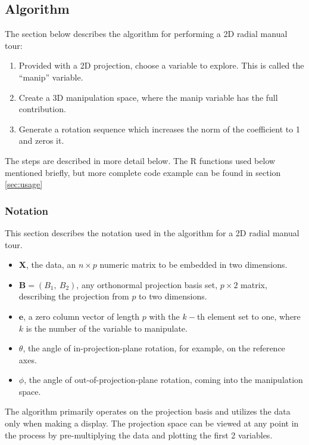 \hypertarget{sec:algorithm}{%
\subsection{Algorithm}\label{sec:algorithm}}

The section below describes the algorithm for performing a 2D radial manual tour:

\begin{enumerate}
\def\labelenumi{\arabic{enumi}.}
\tightlist
\item
  Provided with a 2D projection, choose a variable to explore. This is called the ``manip'' variable.
\item
  Create a 3D manipulation space, where the manip variable has the full contribution.
\item
  Generate a rotation sequence which increases the norm of the coefficient to 1 and zeros it.
\end{enumerate}

The steps are described in more detail below. The R functions used below mentioned briefly, but more complete code example can be found in section \ref{sec:usage}

\hypertarget{notation}{%
\subsubsection{Notation}\label{notation}}

This section describes the notation used in the algorithm for a 2D radial manual tour.

\begin{itemize}
  \item $\textbf{X}$, the data, an $n \times p$ numeric matrix to be embedded in two dimensions.
  \item $\textbf{B} = (B_1,~ B_2)$, any orthonormal projection basis set, $p \times 2$ matrix, describing the projection from $p$ to two dimensions.
  \item $\textbf{e}$, a zero column vector of length $p$ with the $k-$th element set to one, where $k$ is the number of the variable to manipulate.
  \item $\theta$, the angle of in-projection-plane rotation, for example, on the reference axes. 
  \item $\phi$, the angle of out-of-projection-plane rotation, coming into the manipulation space.
\end{itemize}

The algorithm primarily operates on the projection basis and utilizes the data only when making a display. The projection space can be viewed at any point in the process by pre-multiplying the data and plotting the first 2 variables.

